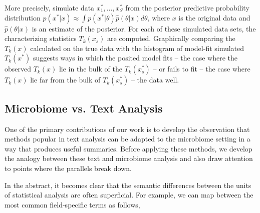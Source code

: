 \documentclass[oupdraft]{bio}
\begin{document}
More precisely, simulate data $x_{1}^{\ast}, \dots, x_{S}^{\ast}$ from the
posterior predictive probability distribution $p\left(x^{\ast}\vert x\right)
\approx \int p\left(x^{\ast} \vert \theta\right) \hat{p}\left(\theta \vert x
\right)d\theta$, where $x$ is the original data and $\hat{p}\left(\theta \vert
x\right)$ is an estimate of the posterior. For each of these simulated data
sets, the characterizing statistics $T_{k}\left(x_{s}\right)$ are computed.
Graphically comparing the $T_{k}\left(x\right)$ calculated on the true data with
the histogram of model-fit simulated $T_{k}\left(x^{\ast}\right)$ suggests ways
in which the posited model fits -- the case where the observed
$T_{k}\left(x\right)$ lie in the bulk of the $T_{k}\left(x^{\ast}_{s}\right)$ --
or fails to fit -- the case where $T_{k}\left(x\right)$ lie far from the bulk of
$T_{k}\left(x^{\ast}_{s}\right)$ -- the data well.

\subsection{Microbiome vs. Text Analysis}
\label{sec:microbiome_vs_text_analysis}

One of the primary contributions of our work is to develop the observation that
methods popular in text analysis can be adapted to the microbiome setting in a
way that produces useful summaries. Before applying these methods, we develop
the analogy between these text and microbiome analysis and also draw attention
to points where the parallels break down.

In the abstract, it becomes clear that the semantic differences between the
units of statistical analysis are often superficial. For example, we can map
between the most common field-specific terms as follows,
\end{document}
